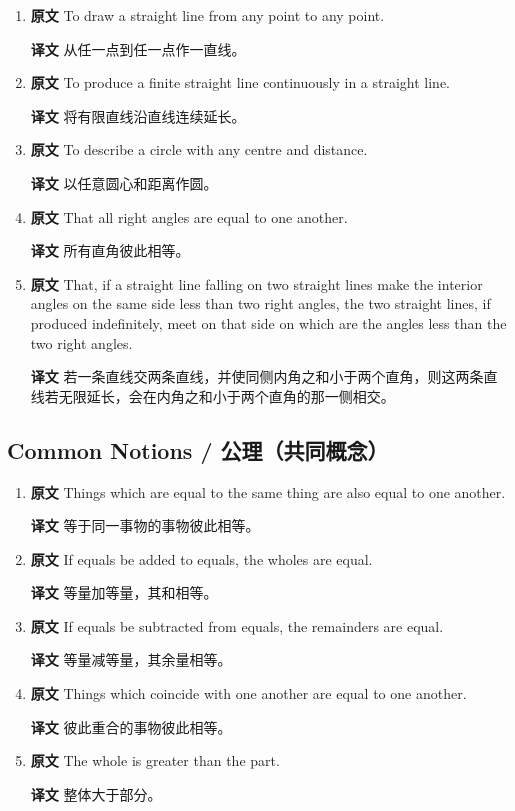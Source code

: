 \documentclass[UTF8,zihao=-4]{ctexart}
\begin{document}
\begin{enumerate}
\item \textbf{原文} To draw a straight line from any point to any point. \par\textbf{译文} 从任一点到任一点作一直线。
\item \textbf{原文} To produce a finite straight line continuously in a straight line. \par\textbf{译文} 将有限直线沿直线连续延长。
\item \textbf{原文} To describe a circle with any centre and distance. \par\textbf{译文} 以任意圆心和距离作圆。
\item \textbf{原文} That all right angles are equal to one another. \par\textbf{译文} 所有直角彼此相等。
\item \textbf{原文} That, if a straight line falling on two straight lines make the interior angles on the same side less than two right angles, the two straight lines, if produced indefinitely, meet on that side on which are the angles less than the two right angles. \par\textbf{译文} 若一条直线交两条直线，并使同侧内角之和小于两个直角，则这两条直线若无限延长，会在内角之和小于两个直角的那一侧相交。
\end{enumerate}

\subsection*{Common Notions / 公理（共同概念）}

\begin{enumerate}
\item \textbf{原文} Things which are equal to the same thing are also equal to one another. \par\textbf{译文} 等于同一事物的事物彼此相等。
\item \textbf{原文} If equals be added to equals, the wholes are equal. \par\textbf{译文} 等量加等量，其和相等。
\item \textbf{原文} If equals be subtracted from equals, the remainders are equal. \par\textbf{译文} 等量减等量，其余量相等。
\item \textbf{原文} Things which coincide with one another are equal to one another. \par\textbf{译文} 彼此重合的事物彼此相等。
\item \textbf{原文} The whole is greater than the part. \par\textbf{译文} 整体大于部分。
\end{enumerate}
\end{document}
